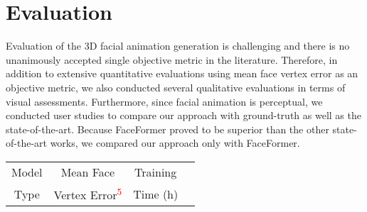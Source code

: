 \documentclass[10pt,twocolumn,letterpaper]{article}
\begin{document}
\section{Evaluation}
Evaluation of the 3D facial animation generation is challenging and there is no unanimously accepted single objective metric in the literature. Therefore, in addition to extensive quantitative evaluations using mean face vertex error as an objective metric, we also conducted several qualitative evaluations in terms of visual assessments. Furthermore, since facial animation is perceptual, we conducted user studies to compare our approach with ground-truth as well as the state-of-the-art. Because FaceFormer proved to be superior than the other state-of-the-art works, we compared our approach only with FaceFormer\cite{faceformer2022}. 
\begingroup
\setlength{\tabcolsep}{4pt} \renewcommand{\arraystretch}{0.6} \begin{table}[t]
  \centering
  \begin{tabular}{c c c c}
    \toprule
    Model & Mean Face & Training\\
    Type & Vertex Error\textsuperscript{\textcolor{red}{5}} & Time (h)\\
    \midrule


\end{tabular}
\end{table}
\end{document}
